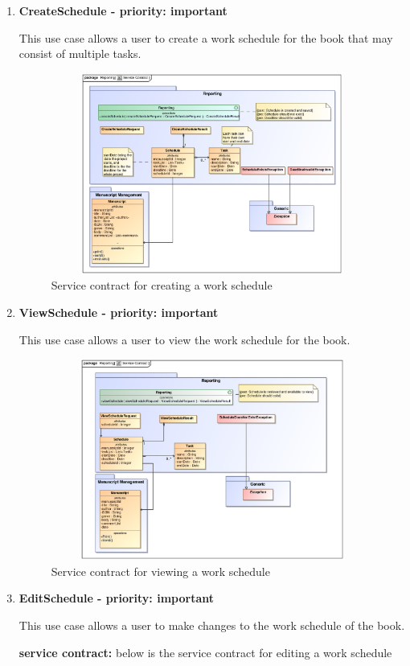 \begin{enumerate}
\item \textbf{CreateSchedule - priority: important}
\par{This use case allows a user to create a work schedule for the book that may consist of multiple tasks.}

\begin{figure}[h]
\includegraphics[height=250px, width=500px]{epsImages/Reporting/createSchedule.eps}
\caption{Service contract for creating a work schedule}
\end{figure}

\item \textbf{ViewSchedule - priority: important}
\par{This use case allows a user to view the work schedule for the book.}

\begin{figure}[h]
\includegraphics[height=250px, width=500px]{epsImages/Reporting/viewSchedule.eps}
\caption{Service contract for viewing a work schedule}
\end{figure}

\item \textbf{EditSchedule - priority: important}\\
\par{This use case allows a user to make changes to the work schedule of the book.}
\par{\textbf{service contract:} below is the service contract for editing a work schedule}


\end{enumerate}
